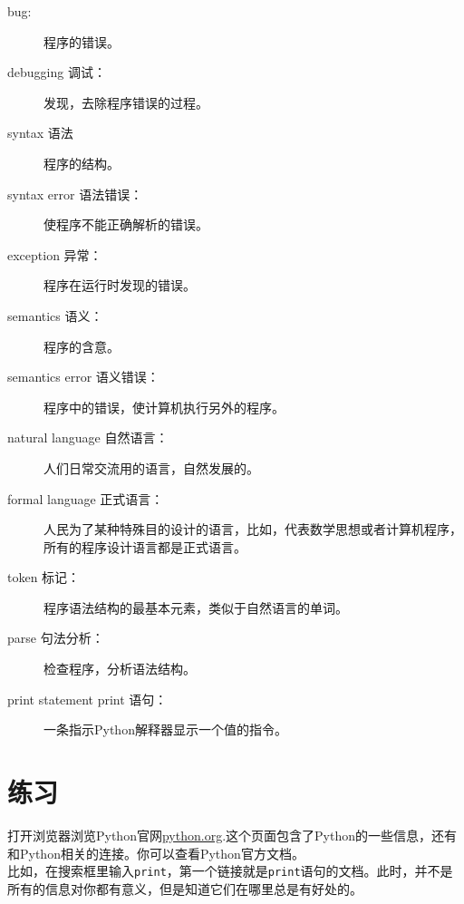 \documentclass[10pt]{book}
\begin{document}
\begin{description}
\item[bug:] 程序的错误。

\item[debugging 调试：]发现，去除程序错误的过程。

\item[syntax 语法] 程序的结构。

\item[syntax error 语法错误：]使程序不能正确解析的错误。


\item[exception 异常：]程序在运行时发现的错误。

\item[semantics  语义：]程序的含意。

\item[semantics error 语义错误：] 程序中的错误，使计算机执行另外的程序。

\item[natural language 自然语言：]人们日常交流用的语言，自然发展的。

\item[formal language 正式语言：]人民为了某种特殊目的设计的语言，比如，代表数学思想或者计算机程序，所有的程序设计语言都是正式语言。

\item[token 标记：]程序语法结构的最基本元素，类似于自然语言的单词。

\item[parse 句法分析：]检查程序，分析语法结构。

\item[print statement print 语句：]一条指示Python解释器显示一个值的指令。


\end{description}

\section{练习}

\begin{ex}
打开浏览器浏览Python官网\url{python.org}.这个页面包含了Python的一些信息，还有和Python相关的连接。你可以查看Python官方文档。\\

比如，在搜索框里输入{\tt print}，第一个链接就是{\tt print}语句的文档。此时，并不是所有的信息对你都有意义，但是知道它们在哪里总是有好处的。

\end{ex}
\end{document}
